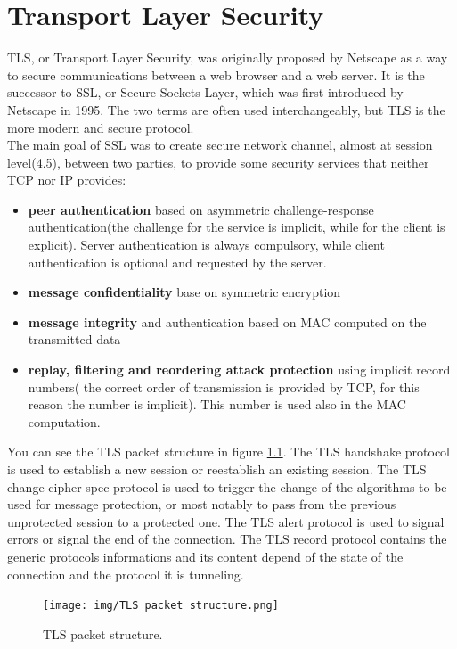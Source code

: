 \chapter{Transport Layer Security}
TLS, or Transport Layer Security, was originally proposed by Netscape
as a way to secure communications between a web browser and a
web server. It is the successor to SSL, or Secure Sockets Layer, which
was first introduced by Netscape in 1995. The two terms are often used
interchangeably, but TLS is the more modern and secure protocol.\\ 
The main goal of SSL was to create secure network channel, almost at
session level(4.5), between two parties, to provide some security
services that neither TCP nor IP provides:
\begin{itemize}
  \item \textbf{peer authentication} based on asymmetric
    challenge-response authentication(the challenge for the service is
    implicit, while for the client is explicit). Server authentication
    is always compulsory, while client authentication is optional and
    requested by the server.
  \item \textbf{message confidentiality} base on symmetric encryption
  \item \textbf{message integrity} and authentication based on MAC
    computed on the transmitted data
  \item \textbf{replay, filtering and reordering attack protection}
    using implicit record numbers( the correct order of transmission
    is provided by TCP, for this reason the number is implicit). This
    number is used also in the MAC computation.

\end{itemize}

You can see the TLS packet structure in figure
\ref{fig:tls-packet-structure}.
The TLS handshake protocol is used to establish a new session or 
reestablish an existing session. The TLS change cipher spec protocol 
is used to trigger the change of the algorithms to be used for message 
protection, or most notably to pass from the previous unprotected 
session to a protected one. The TLS alert protocol is used to signal
errors or signal the end of the connection. 
The TLS record protocol contains the generic protocols informations
and its content depend of the state of the connection and the protocol
it is tunneling.
\begin{figure}[H]
    \centering
    \texttt{[image: img/TLS packet
    structure.png]}
    \caption{TLS packet structure.}
    \label{fig:tls-packet-structure}
\end{figure}

